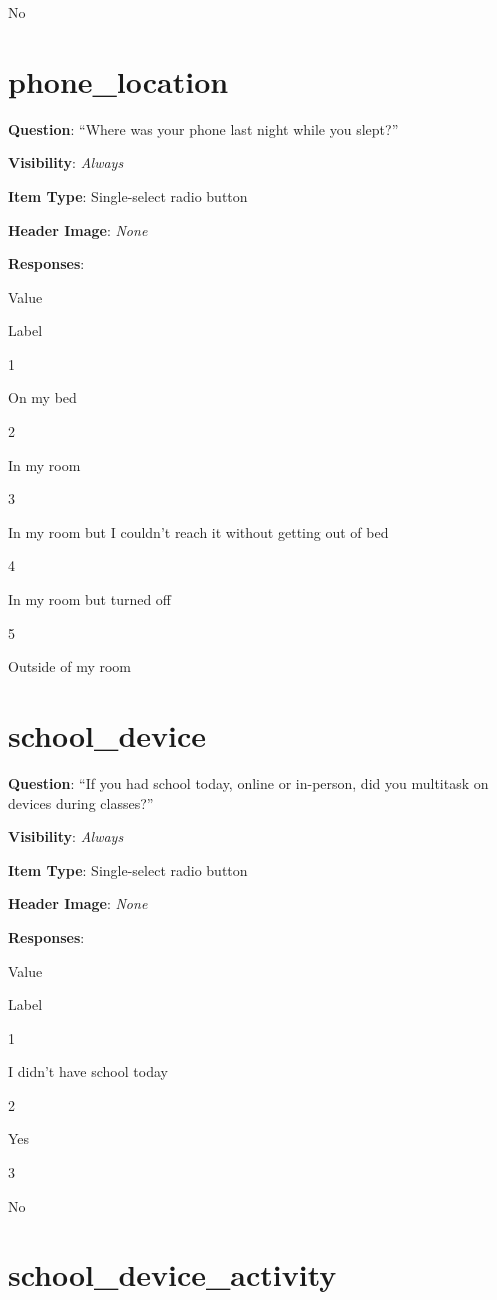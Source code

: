 \documentclass[]{book}
\begin{document}
No

\hypertarget{phone_location}{%
\section{phone\_location}\label{phone_location}}

\textbf{Question}: ``Where was your phone last night while you slept?''

\textbf{Visibility}: \emph{Always}

\textbf{Item Type}: Single-select radio button

\textbf{Header Image}: \emph{None}

\textbf{Responses}:

Value

Label

1

On my bed

2

In my room

3

In my room but I couldn't reach it without getting out of bed

4

In my room but turned off

5

Outside of my room

\hypertarget{school_device}{%
\section{school\_device}\label{school_device}}

\textbf{Question}: ``If you had school today, online or in-person, did you multitask on devices during classes?''

\textbf{Visibility}: \emph{Always}

\textbf{Item Type}: Single-select radio button

\textbf{Header Image}: \emph{None}

\textbf{Responses}:

Value

Label

1

I didn't have school today

2

Yes

3

No

\hypertarget{school_device_activity}{%
\section{school\_device\_activity}\label{school_device_activity}}
\end{document}
